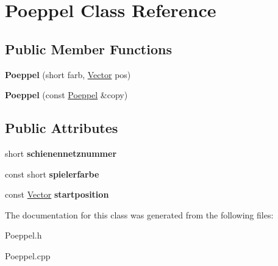 \hypertarget{class_poeppel}{\section{Poeppel Class Reference}
\label{class_poeppel}
}
\subsection*{Public Member Functions}
\begin{DoxyCompactItemize}
\item 
\hypertarget{class_poeppel_ae04ebf45f513174d7b45b75eccf025b0}{{\bfseries Poeppel} (short farb, \hyperlink{class_vector}{Vector} pos)}\label{class_poeppel_ae04ebf45f513174d7b45b75eccf025b0}

\item 
\hypertarget{class_poeppel_a253cd856015b757908a07bb88cf72d48}{{\bfseries Poeppel} (const \hyperlink{class_poeppel}{Poeppel} \&copy)}\label{class_poeppel_a253cd856015b757908a07bb88cf72d48}

\end{DoxyCompactItemize}
\subsection*{Public Attributes}
\begin{DoxyCompactItemize}
\item 
\hypertarget{class_poeppel_a3bd9c0c24f0942c45860456d74e1d6c3}{short {\bfseries schienennetznummer}}\label{class_poeppel_a3bd9c0c24f0942c45860456d74e1d6c3}

\item 
\hypertarget{class_poeppel_a6ecf97e3a19a3bf8108a105f0f2603ca}{const short {\bfseries spielerfarbe}}\label{class_poeppel_a6ecf97e3a19a3bf8108a105f0f2603ca}

\item 
\hypertarget{class_poeppel_a45360c7e6518f8ce80ab681f90a58824}{const \hyperlink{class_vector}{Vector} {\bfseries startposition}}\label{class_poeppel_a45360c7e6518f8ce80ab681f90a58824}

\end{DoxyCompactItemize}


The documentation for this class was generated from the following files\-:\begin{DoxyCompactItemize}
\item 
Poeppel.\-h\item 
Poeppel.\-cpp\end{DoxyCompactItemize}
